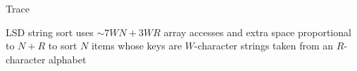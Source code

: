 \documentclass[8pt,a4paper,compress]{beamer}
\begin{document}
\begin{frame}[fragile]
\pause

Trace

\begin{center}
\end{center}

\pause
\bigskip

LSD string sort uses $\sim 7WN + 3WR$ array accesses and
extra space proportional to $N + R$ to sort $N$ items whose keys are $W$-character strings taken from an $R$-character alphabet
\end{frame}
\end{document}
